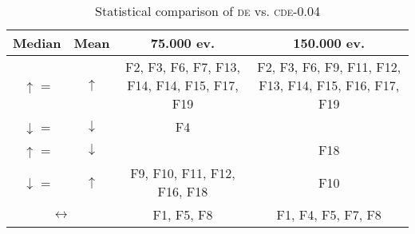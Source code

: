 \begin{table}[!t]
\caption{Statistical comparison of \textsc{de} vs. \textsc{cde}-0.04}
\label{tab:de_vs_cde004_stats}
\centering
\begin{scriptsize}
\begin{tabular}{c c || c | c}
\hline
Median       & Mean                   & 75.000 ev.                                   & 150.000 ev. \\ \hline
$\uparrow$ =   & $\uparrow$             & F2, F3, F6, F7, F13, F14, F14, F15, F17, F19 & F2, F3, F6, F9, F11, F12, F13, F14, F15, F16, F17, F19\\ \hline
$\downarrow$ = & $\downarrow$           & F4                                           & \\ \hline
$\uparrow$ =  & $\downarrow$           &                                              & F18 \\ \hline
$\downarrow$ = & $\uparrow$             & F9, F10, F11, F12, F16, F18                  & F10 \\ \hline
\multicolumn{2}{c||}{$\leftrightarrow$} & F1, F5, F8                                 & F1, F4, F5, F7, F8 \\ \hline
\end{tabular}
\end{scriptsize}
\end{table}
